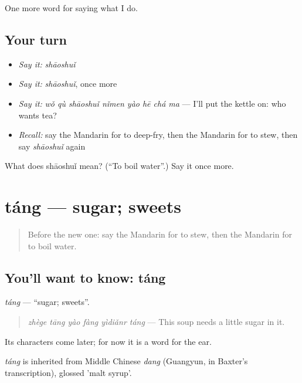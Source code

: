 \begin{grammarlens}[title={What you've built}]
One more word for saying what I do.
\end{grammarlens}

\subsection*{Your turn}
\begin{itemize}
\raggedright
  \item \emph{Say it:} \emph{shāoshuǐ}
  \item \emph{Say it:} \emph{shāoshuǐ}, once more
  \item \emph{Say it:} \emph{wǒ qù shāoshuǐ nǐmen yào hē chá ma} — I'll put the kettle on: who wants tea?
  \item \emph{Recall:} say the Mandarin for to deep-fry, then the Mandarin for to stew, then say \emph{shāoshuǐ} again
\end{itemize}

\begin{tcolorbox}[breakable,colback=teal!4,colframe=teal!35!black,title={Before you move on}]
What does shāoshuǐ mean? (\textquotedblleft{}To boil water\textquotedblright{}.) Say it once more.
\end{tcolorbox}
\section[táng]{táng — sugar; sweets}

\label{lesson:ZH-C168-tang}



\begin{quote}
Before the new one: say the Mandarin for to stew, then the Mandarin for to boil water.
\end{quote}

\subsection*{You'll want to know: táng}
\emph{táng} — \textquotedblleft{}sugar; sweets\textquotedblright{}.

\begin{quote}
\emph{zhège tāng yào fàng yìdiǎnr táng} — This soup needs a little sugar in it.
\end{quote}

Its characters come later; for now it is a word for the ear.

\begin{cousinweb}
\emph{táng} is inherited from Middle Chinese \emph{dang} (Guangyun, in Baxter's transcription), glossed 'malt syrup'.
\end{cousinweb}


